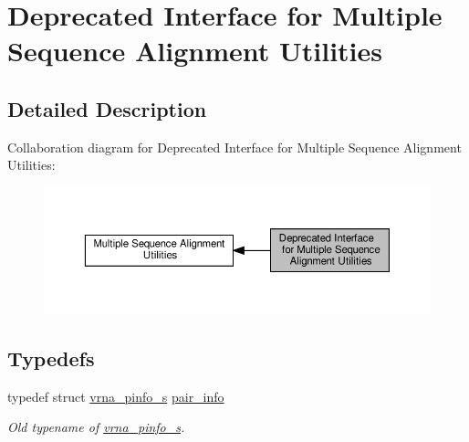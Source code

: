 \hypertarget{group__aln__utils__deprecated}{}\section{Deprecated Interface for Multiple Sequence Alignment Utilities}
\label{group__aln__utils__deprecated}


\subsection{Detailed Description}
Collaboration diagram for Deprecated Interface for Multiple Sequence Alignment Utilities\+:
\nopagebreak
\begin{figure}[H]
\begin{center}
\leavevmode
\includegraphics[width=350pt]{group__aln__utils__deprecated}
\end{center}
\end{figure}
\subsection*{Typedefs}
\begin{DoxyCompactItemize}
\item 
typedef struct \hyperlink{group__aln__utils_structvrna__pinfo__s}{vrna\+\_\+pinfo\+\_\+s} \hyperlink{group__aln__utils__deprecated_ga7b61662a793ad0aa1ea38efc3a5baacc}{pair\+\_\+info}
\begin{DoxyCompactList}\small\item\em Old typename of \hyperlink{group__aln__utils_structvrna__pinfo__s}{vrna\+\_\+pinfo\+\_\+s}. \end{DoxyCompactList}\end{DoxyCompactItemize}
